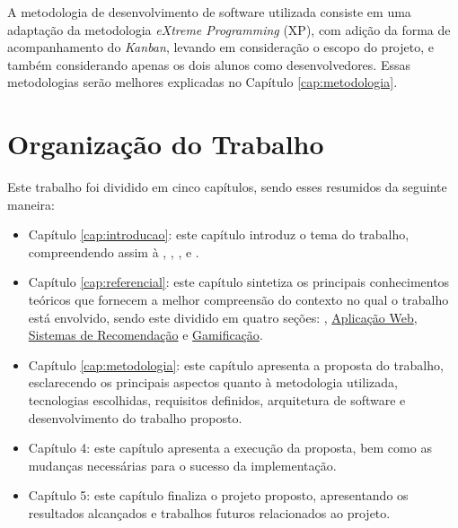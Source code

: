 A metodologia de desenvolvimento de software utilizada consiste em uma adaptação da metodologia \textit{eXtreme Programming} (XP), com adição da forma de acompanhamento do \textit{Kanban}, levando em consideração o escopo do projeto, e também considerando apenas os dois alunos como desenvolvedores. Essas metodologias serão melhores explicadas no Capítulo \ref{cap:metodologia}.

\section[Organização do Trabalho]{Organização do Trabalho}
\label{sec:organizacao}
Este trabalho foi dividido em cinco capítulos, sendo esses resumidos da seguinte maneira:

\begin{itemize}
    \item Capítulo \ref{cap:introducao}: este capítulo introduz o tema do trabalho, compreendendo assim à , , ,  e .

    \item Capítulo \ref{cap:referencial}: este capítulo sintetiza os principais conhecimentos teóricos que fornecem a melhor compreensão do contexto no qual o trabalho está envolvido, sendo este dividido em quatro seções: , \hyperref[sec:aw]{Aplicação Web}, \hyperref[sec:recomendação]{Sistemas de Recomendação} e \hyperref[sec:gamificacao]{Gamificação}.

    \item Capítulo \ref{cap:metodologia}: este capítulo apresenta a proposta do trabalho, esclarecendo os principais aspectos quanto à metodologia utilizada, tecnologias escolhidas, requisitos definidos, arquitetura de software e desenvolvimento do trabalho proposto.
    
    \item Capítulo 4: este capítulo apresenta a execução da proposta, bem como as mudanças necessárias para o sucesso da implementação.

    \item Capítulo 5: este capítulo finaliza o projeto proposto, apresentando os resultados alcançados e trabalhos futuros relacionados ao projeto.
\end{itemize}